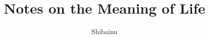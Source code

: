 \documentclass{article}
\author{Shibainu}
\title{Notes on the Meaning of Life}
\begin{document}
\date{}
\maketitle




\end{document}

